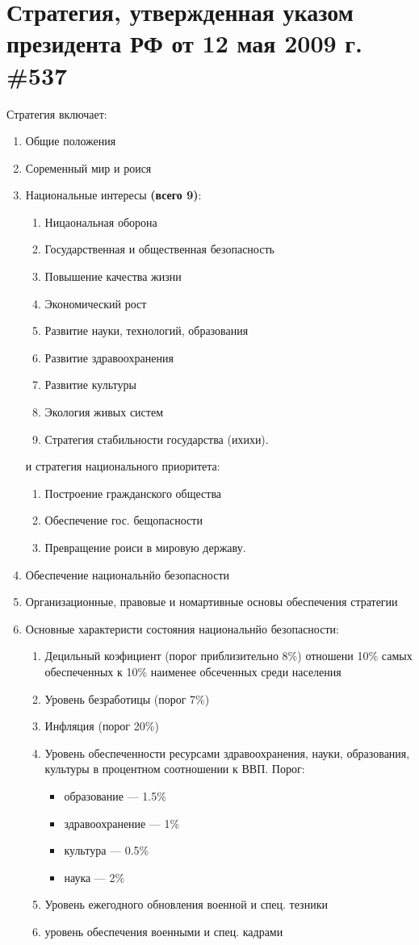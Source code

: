 \documentclass[oneside,final,14pt]{extreport}
\begin{document}
\section*{Стратегия, утвержденная указом президента РФ от 12 мая 2009 г. \#537}
Стратегия включает:
\begin{enumerate}
	\item Общие положения
	\item Соременный мир и роися
	\item Национальные интересы \textbf{(всего 9)}:
	\begin{enumerate}
		\item Ницаональная оборона
		\item Государственная и общественная безопасность
		\item Повышение качества жизни
		\item Экономический рост
		\item Развитие науки, технологий, образования
		\item Развитие здравоохранения
		\item Развитие культуры
		\item Экология живых систем
		\item Стратегия стабильности государства (ихихи).
	\end{enumerate}
	и стратегия национального приоритета:
	\begin{enumerate}
		\item Построение гражданского общества
		\item Обеспечение гос. бещопасности
		\item Превращение роиси в мировую державу.
	\end{enumerate}
	\item Обеспечение национальнйо безопасности
	\item Организационные, правовые и номартивные основы обеспечения стратегии
	\item Основные характеристи состояния национальнйо безопасности:
	\begin{enumerate}
		\item Децильный коэфициент (порог приблизительно 8\%) отношени 10\% самых обеспеченных к 10\% наименее обсеченных среди населения
		\item Уровень безработицы (порог 7\%)
		\item Инфляция (порог 20\%)
		\item Уровень обеспеченности ресурсами здравоохранения, науки, образования, культуры в процентном соотношении к ВВП. Порог:
		\begin{itemize}
			\item образование --- 1.5\%
			\item здравоохранение --- 1\%
			\item культура --- 0.5\%
			\item наука --- 2\%
		\end{itemize}
		\item Уровень ежегодного обновления военной и спец. тезники
		\item уровень обеспечения военными и спец. кадрами
	\end{enumerate}
\end{enumerate}
\end{document}
